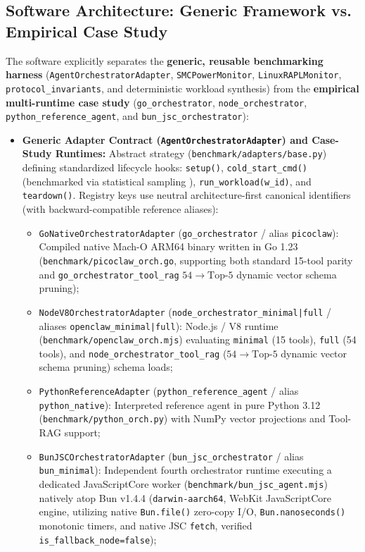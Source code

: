 \documentclass[preprint,12pt,3p]{elsarticle}
\begin{document}
\subsection{Software Architecture: Generic Framework vs. Empirical Case Study}
The software explicitly separates the \textbf{generic, reusable benchmarking harness} (\texttt{AgentOrchestratorAdapter}, \texttt{SMCPowerMonitor}, \texttt{LinuxRAPLMonitor}, \texttt{protocol\_invariants}, and deterministic workload synthesis) from the \textbf{empirical multi-runtime case study} (\texttt{go\_orchestrator}, \texttt{node\_orchestrator}, \texttt{python\_reference\_agent}, and \texttt{bun\_jsc\_orchestrator}):
\begin{itemize}
    \item \textbf{Generic Adapter Contract (\texttt{AgentOrchestratorAdapter}) and Case-Study Runtimes:} Abstract strategy (\texttt{benchmark/adapters/base.py}) defining standardized lifecycle hooks: \texttt{setup()}, \texttt{cold\_start\_cmd()} (benchmarked via statistical sampling \cite{kalibera2013rigorous}), \texttt{run\_workload(w\_id)}, and \texttt{teardown()}. Registry keys use neutral architecture-first canonical identifiers (with backward-compatible reference aliases):
    \begin{itemize}
        \item \texttt{GoNativeOrchestratorAdapter} (\texttt{go\_orchestrator} / alias \texttt{picoclaw}): Compiled native Mach-O ARM64 binary written in Go 1.23 (\texttt{benchmark/picoclaw\_orch.go}, supporting both standard 15-tool parity and \texttt{go\_orchestrator\_tool\_rag} $54 \rightarrow \text{Top-}5$ dynamic vector schema pruning);
        \item \texttt{NodeV8OrchestratorAdapter} (\texttt{node\_orchestrator\_minimal|full} / aliases \texttt{openclaw\_minimal|full}): Node.js / V8 runtime (\texttt{benchmark/openclaw\_orch.mjs}) evaluating \texttt{minimal} (15 tools), \texttt{full} (54 tools), and \texttt{node\_orchestrator\_tool\_rag} ($54 \rightarrow \text{Top-}5$ dynamic vector schema pruning) schema loads;
        \item \texttt{PythonReferenceAdapter} (\texttt{python\_reference\_agent} / alias \texttt{python\_native}): Interpreted reference agent in pure Python 3.12 (\texttt{benchmark/python\_orch.py}) with NumPy vector projections and Tool-RAG support;
        \item \texttt{BunJSCOrchestratorAdapter} (\texttt{bun\_jsc\_orchestrator} / alias \texttt{bun\_minimal}): Independent fourth orchestrator runtime executing a dedicated JavaScriptCore worker (\texttt{benchmark/bun\_jsc\_agent.mjs}) natively atop Bun v1.4.4 (\texttt{darwin-aarch64}, WebKit JavaScriptCore engine, utilizing native \texttt{Bun.file()} zero-copy I/O, \texttt{Bun.nanoseconds()} monotonic timers, and native JSC \texttt{fetch}, verified \texttt{is\_fallback\_node=false});

\end{itemize}
\end{itemize}
\end{document}
